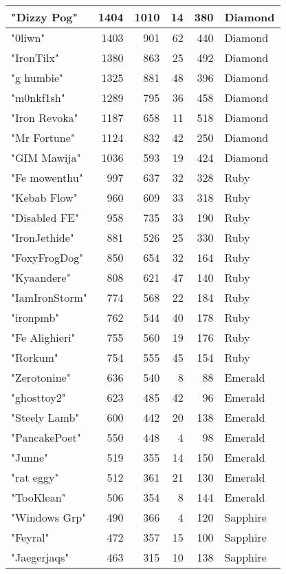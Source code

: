 \documentclass{article}
\begin{document}
\begin{table}[htbp]
\begin{tabular}{|l|r|r|r|r|l|}
"Dizzy Pog" & 1404 & 1010 & 14 & 380 & Diamond \\ \hline
"0liwn" & 1403 & 901 & 62 & 440 & Diamond \\ \hline
"IronTilx" & 1380 & 863 & 25 & 492 & Diamond \\ \hline
"g humbie" & 1325 & 881 & 48 & 396 & Diamond \\ \hline
"m0nkf1sh" & 1289 & 795 & 36 & 458 & Diamond \\ \hline
"Iron Revoka" & 1187 & 658 & 11 & 518 & Diamond \\ \hline
"Mr Fortune" & 1124 & 832 & 42 & 250 & Diamond \\ \hline
"GIM Mawija" & 1036 & 593 & 19 & 424 & Diamond \\ \hline
"Fe mowenthu" & 997 & 637 & 32 & 328 & Ruby \\ \hline
"Kebab Flow" & 960 & 609 & 33 & 318 & Ruby \\ \hline
"Disabled FE" & 958 & 735 & 33 & 190 & Ruby \\ \hline
"IronJethide" & 881 & 526 & 25 & 330 & Ruby \\ \hline
"FoxyFrogDog" & 850 & 654 & 32 & 164 & Ruby \\ \hline
"Kyaandere" & 808 & 621 & 47 & 140 & Ruby \\ \hline
"IamIronStorm" & 774 & 568 & 22 & 184 & Ruby \\ \hline
"ironpmb" & 762 & 544 & 40 & 178 & Ruby \\ \hline
"Fe Alighieri" & 755 & 560 & 19 & 176 & Ruby \\ \hline
"Rorkum" & 754 & 555 & 45 & 154 & Ruby \\ \hline
"Zerotonine" & 636 & 540 & 8 & 88 & Emerald \\ \hline
"ghosttoy2" & 623 & 485 & 42 & 96 & Emerald \\ \hline
"Steely Lamb" & 600 & 442 & 20 & 138 & Emerald \\ \hline
"PancakePoet" & 550 & 448 & 4 & 98 & Emerald \\ \hline
"Junne" & 519 & 355 & 14 & 150 & Emerald \\ \hline
"rat eggy" & 512 & 361 & 21 & 130 & Emerald \\ \hline
"TooKlean" & 506 & 354 & 8 & 144 & Emerald \\ \hline
"Windows Grp" & 490 & 366 & 4 & 120 & Sapphire \\ \hline
"Feyral" & 472 & 357 & 15 & 100 & Sapphire \\ \hline
"Jaegerjaqs" & 463 & 315 & 10 & 138 & Sapphire \\ \hline

\end{tabular}
\end{table}
\end{document}
